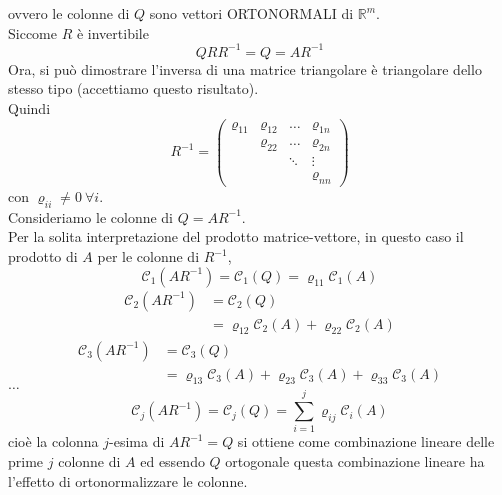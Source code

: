 ovvero le colonne di $Q$ sono vettori ORTONORMALI di $\mathbb{R}^m$. \\
Siccome $R$ è invertibile 
\begin{equation*}
    QRR^{-1} = Q = AR^{-1}
\end{equation*}
Ora, si può dimostrare l'inversa di una matrice triangolare è triangolare dello stesso tipo (accettiamo questo risultato). \\
Quindi
\begin{equation*}
    R^{-1}=\begin{pmatrix}
         \varrho_{11} & \varrho_{12} & \dots & \varrho_{1n} \\
          & \varrho_{22} & \dots & \varrho_{2n} \\
          & & \ddots & \vdots \\
          & & & \varrho_{nn} 
    \end{pmatrix}
\end{equation*}
con $\varrho_{ii}\neq 0 \ \forall i$.\\
Consideriamo le colonne di $Q=AR^{-1}$. \\
Per la solita interpretazione del prodotto matrice-vettore, in questo caso il prodotto di $A$ per le colonne di $R^{-1}$,
\begin{equation*}
    \mathcal{C}_1(AR^{-1})=\mathcal{C}_1(Q)=\varrho_{11}\mathcal{C}_1(A)
\end{equation*}
\begin{equation*}
    \begin{split}
        \mathcal{C}_2(AR^{-1})& =\mathcal{C}_2(Q)\\
        &=\varrho_{12}\mathcal{C}_2(A) + \varrho_{22}\mathcal{C}_2(A)
    \end{split}
\end{equation*}
\begin{equation*}
    \begin{split}
        \mathcal{C}_3(AR^{-1})& =\mathcal{C}_3(Q)\\
        &=\varrho_{13}\mathcal{C}_3(A) + \varrho_{23}\mathcal{C}_3(A) + \varrho_{33}\mathcal{C}_3(A)
    \end{split}
\end{equation*}
$\dots$
\begin{equation*}
    \mathcal{C}_j(AR^{-1})=\mathcal{C}_j(Q)=\sum_{i=1}^j\varrho_{ij}\mathcal{C}_i(A)
\end{equation*}
cioè la colonna $j$-esima di $AR^{-1}=Q$ si ottiene come combinazione lineare delle prime $j$ colonne di $A$ ed essendo $Q$ ortogonale questa combinazione lineare ha l'effetto di ortonormalizzare le colonne.\\
